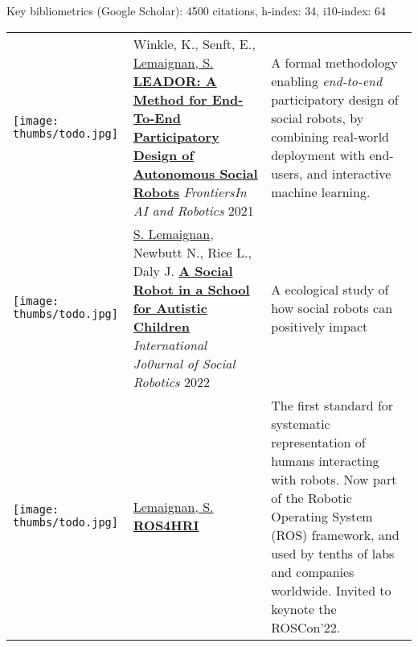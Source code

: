 Key bibliometrics (Google Scholar): 4500 citations, h-index: 34, i10-index: 64


\hspace*{-0.5cm}\begin{tabular}{p{1.7cm}p{7cm}p{8cm}}

    \vspace{-0.2cm}\texttt{[image: thumbs/todo.jpg]} &
    Winkle, K., Senft, E., \ul{Lemaignan, S.}
    \newline\href{}{\textbf{LEADOR: A Method for End-To-End Participatory Design of Autonomous Social Robots}}
    \newline \textit{FrontiersIn AI and Robotics} 2021
    & \small A formal methodology enabling \emph{end-to-end} participatory
    design of social robots, by combining real-world deployment with end-users,
    and interactive machine learning.\textbf{} \\

    \vspace{-0.2cm}\texttt{[image: thumbs/todo.jpg]} &
    \ul{S. Lemaignan}, Newbutt N., Rice L., Daly J.
    \newline\href{https://doi.org/10.1007/s12369-022-00928-4}{\textbf{A Social Robot in a School for Autistic Children}}
    \newline \textit{International Jo0urnal of Social Robotics} 2022
    & \small A ecological study of how social robots can positively impact \textbf{} \\






    \vspace{-0.2cm}\texttt{[image: thumbs/todo.jpg]} &
    \ul{Lemaignan, S.}
    \newline\href{https://wiki.ros.org/hri}{\textbf{ROS4HRI}}
    \newline 2022
    & \small The first standard for systematic representation of humans
    interacting with robots. Now part of the Robotic Operating System (ROS)
    framework, and used by tenths of labs and companies worldwide. Invited to
    keynote the ROSCon'22. \textbf{} \\



\end{tabular}
